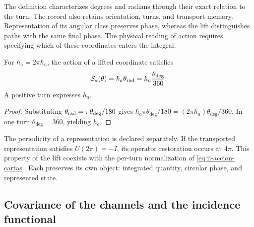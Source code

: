 The definition characterizes degrees and radians through their exact relation
to the turn. The record also retains orientation, turns, and
transport memory. Representation of its angular class preserves
phase, whereas the lift distinguishes paths with the same
final phase. The physical reading of action requires specifying which of
these coordinates enters the integral.

\begin{proposition}
For \(h_a=2\pi\hbar_a\), the action of a lifted coordinate
satisfies
\begin{equation}
 \mathcal S_a(\theta)
 =\hbar_a\theta_{\rm rad}
 =h_a\frac{\theta_{\deg}}{360}.
 \label{eq:ii-accion-cartas}
\end{equation}
A positive turn expresses \(h_a\).
\end{proposition}
\begin{proof}
Substituting \(\theta_{\rm rad}=\pi\theta_{\deg}/180\) gives
\(\hbar_a\pi\theta_{\deg}/180
=(2\pi\hbar_a)\theta_{\deg}/360\). In one turn
\(\theta_{\deg}=360\), yielding \(h_a\).
\end{proof}

The periodicity of a representation is declared separately. If the
transported representation satisfies \(U(2\pi)=-I\), its operator
restoration occurs at \(4\pi\). This property of the lift
coexists with the per-turn normalization of
\eqref{eq:ii-accion-cartas}. Each preserves its own object: integrated
quantity, circular phase, and represented state.

\subsection{Covariance of the channels and the incidence functional}

